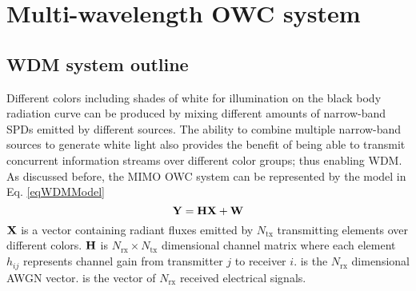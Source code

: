 \section{Multi-wavelength OWC system}
\label{sec:wdmSystem}
\graphicspath{{_System/figures_wdm/}}

\subsection{WDM system outline}
\label{subsec:wdmSystemWdm}

Different colors including shades of white for illumination on the black body radiation curve can be produced by mixing different amounts of narrow-band SPDs emitted by different sources. The ability to combine multiple narrow-band sources to generate white light also provides the benefit of being able to transmit concurrent information streams over different color groups; thus enabling WDM. As discussed before, the MIMO OWC system can be represented by the model in Eq. \eqref{eqWDMModel}
\begin{equation}
	{\bf{Y}} = {\bf{H}}{\bf{X}} + {\bf{W}}
	\label{eqWDMModel}
\end{equation}
${\bf{X}}$ is a vector containing radiant fluxes emitted by $N_{\text{tx}}$ transmitting elements over different colors. ${\bf{H}}$ is $N_{\text{rx}}\times N_{\text{tx}}$ dimensional channel matrix where each element $h_{ij}$ represents channel gain from transmitter $j$ to receiver $i$.  is the $N_{\text{rx}}$ dimensional AWGN vector.  is the vector of $N_{\text{rx}}$ received electrical signals.

